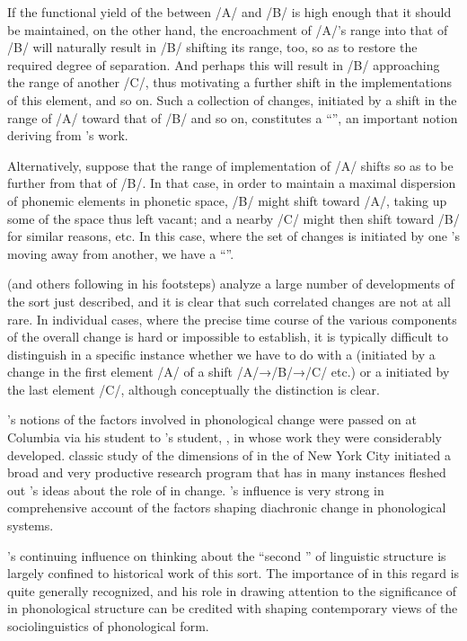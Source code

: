 If the functional yield of the  between /A/ and /B/ is high
enough that it should be maintained, on the other hand, the
encroachment of /A/'s range into that of /B/ will naturally result in
/B/ shifting its range, too, so as to restore the required degree of
separation. And perhaps this will result in /B/ approaching the range
of another  /C/, thus motivating a further shift in the
implementations of this element, and so on. Such a collection of
changes, initiated by a shift in the range of /A/ toward that of /B/
and so on, constitutes a ``'', an important notion deriving
from {\Martinet}'s work.

Alternatively, suppose that the range of implementation of /A/ shifts
so as to be further from that of /B/. In that case, in order to
maintain a maximal dispersion of phonemic elements in phonetic space,
/B/ might shift toward /A/, taking up some of the space thus left
vacant; and a nearby /C/ might then shift toward /B/ for similar
reasons, etc. In this case, where the set of changes is initiated by
one 's moving away from another, we have a ``''.

{\Martinet} (and others following in his footsteps) analyze a large
number of developments of the sort just described, and it is clear
that such correlated changes are not at all rare. In individual
cases, where the precise time course of the various components of the
overall change is hard or impossible to establish, it is typically
difficult to distinguish in a specific instance whether we have to do
with a  (initiated by a change in the first element /A/ of a
shift /A/→/B/→/C/ etc.) or a  initiated by the last element
/C/, although conceptually the distinction is clear.

{\Martinet}'s notions of the factors involved in phonological change were
passed on at Columbia via his student  to {\Weinreich}'s
student, , in whose work they were considerably
developed.  classic study of the
dimensions of  in the  of New York City initiated a
broad and very productive research program that has in many instances
fleshed out {\Martinet}'s ideas about the role of  in
change. {\Martinet}'s influence is very strong in
comprehensive account of the factors shaping diachronic change in
phonological systems.

{\Martinet}'s continuing influence on thinking about the ``second
'' of linguistic structure is largely confined to
historical work of this sort. The importance of
\citealt{martinet55:economie} in this regard is quite generally
recognized, and his role in drawing attention to the significance of
 in phonological structure can be credited with shaping
contemporary views of the sociolinguistics of phonological form.



